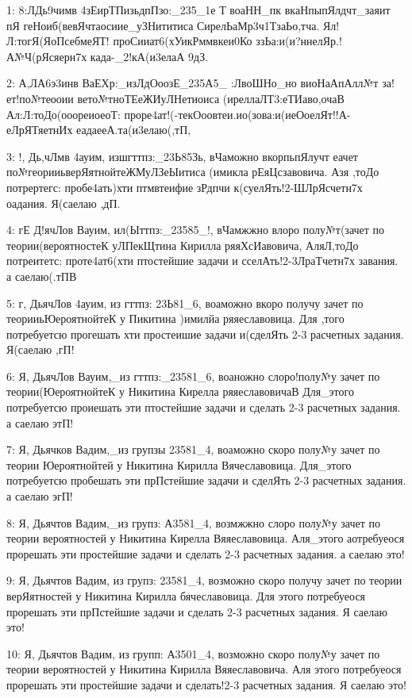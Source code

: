 \vspace{0.5cm}

{ \scriptsize
1: 8:ЛДь9чимв 4зЕирТПизьдпПзо:\_235\_1е Т воаНН\_пк вкаНпыпЯлдчт\_заяит пЯ геНоиб(вевЯчтаосиие\_уЗНититиса СирелЬаМр3ч1ТзаЬо,тча. Ял!Л:тогЯ(ЯоПсебмеЯТ! проСииат6(хУикРммвкеи0Ко ззЬа:и(и?ннелЯр.!А№Ч(рЯсяерн7х када-\_2!кА(и3елаА 9дЗ.

2: А,ЛА6э3инв ВаЕХр:\_изЛдОоозЕ\_235А5\_ :ЛвоШНо\_но виоНаАпАлл№т за!ет!по№теооии вето№тноТЕеЖИуЛНетиоиса (иреллаЛТ3:еТИаво,очаВ Ал:Л:тоДо(ооореиоеоТ: проре4ат!(-текОоовтеи.ио(зова:и(иеОоелЯт!!А-еЛрЯТяетнИх еадаееА.та(и3елаю(,тП,

3: !, Дь,чЛмв 4ауим, изшгттпз:\_23Ь85Зь, вЧаможно вкорпьпЯлучт еачет по№георииьверЯятнойтеЖМуЛЗеЫитиса (имикла рЕяЦсзавовича. Азя ,тоДо потрертегс: пробе4ать)хти птмвтеифие зРдпчи к(суелЯть!2-ШЛрЯсчетн7х оадания. Я(саелаю ,дП.

4: гЕ Д!ячЛов Вауим, ил(Ыттпз:\_23585\_!, вЧамжжно влоро полу№т(зачет по теории(вероятностеК уЛПекЩтина Кирилла ряяХсИавовича, АляЛ,тоДо потреитетс: проте4ат6(хти птостейшие задачи и сселАть!2-3ЛраТчетн7х завания. а саелаю(.тПВ

5: г, ДьячЛов 4ауим, из гттпз: 23Ь81\_6, воаможно вкоро получу зачет по теорииьЮероятнойтеК у Пикитина )имилйа ряяеславовица. Для ,того потребуетсю прогешать хти простеишие задачи и(сделЯть 2-3 расчетных задания. Я(саелаю ,гП!

6: Я, ДьячЛов Вауим,\_из гттпз:\_23581\_6, воаножно слоро!полу№у зачет по теории(ЮероятнойтеК у Никитина Кирелла ряяеславовичаВ Для\_этого потребуетсю проиешать эти птостейшие задачи и сделать 2-3 расчетных задания. а саелаю этП!

7: Я, Дьячков Вадим,\_из групзы 23581\_4, воаможно скоро полу№у зачет по теории Юероятнойтей у Никитина Кирилла Вячеславовица. Для\_этого потребуетсю пробешать эти прПстейшие задачи и сделЯть 2-3 расчетных задания. а саелаю эгП!

8: Я, Дьячтов Вадим,\_из групз: А3581\_4, возмжжно слоро полу№у зачет по теории вероятностей у Никитина Кирелла Вяяеславовица. Аля\_этого аотребуеося прорешать эти простейшие задачи и сделать 2-3 расчетных задания. а саелаю это!

9: Я, Дьячтов Вадим, из групз: 23581\_4, возможно скоро получу зачет по теории верЯятностей у Никитина Кирилла бячеславовица. Для этого потребуеося прорешать эти прПстейшие задачи и сделать 2-3 расчетных задания. Я саелаю это!

10: Я, Дьячтов Вадим, из групп: А3501\_4, возможно скоро полу№у зачет по теории вероятностей у Никитина Кирилла Вяяеславовича. Аля этого потребуеося прорешать эти простейшие задачи и сделать!2-3 расчетных задания. Я саелаю это!

}
